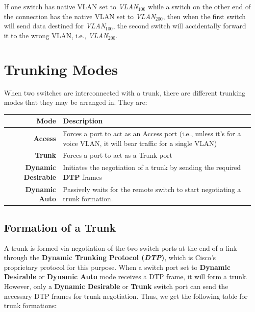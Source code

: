 If one switch has native VLAN set to \textit{VLAN$_{100}$} while a switch on the other end of the connection has the native VLAN set to \textit{VLAN$_{200}$},  then when the first switch will send data destined for \textit{VLAN$_{100}$}, the second switch will accidentally forward it to the wrong VLAN, i.e., \textit{VLAN$_{200}$}. 

\section{Trunking Modes}
When two switches are interconnected with a trunk, there are different trunking modes that they may be arranged in. They are: 

\noindent
\begin{center}
	\begin{tabular}{rm{}}
		\toprule
		\textbf{Mode} &\textbf{Description} \\
		\midrule
		\textbf{Access}	&Forces a port to act as an Access port (i.e., unless it's for a voice VLAN, it will bear traffic for a single VLAN)\\
		\textbf{Trunk}	&Forces a port to act as a Trunk port\\
		\textbf{Dynamic Desirable}	&Initiates the negotiation of a trunk by sending the required \textbf{DTP} frames\\
		\textbf{Dynamic Auto}	&Passively waits for the remote switch to start negotiating a trunk formation.\\
		\bottomrule
	\end{tabular}
\end{center}

\subsection{Formation of a Trunk}
A trunk is formed via negotiation of the two switch ports at the end of a link through the \textbf{Dynamic Trunking Protocol (\textit{DTP})}, which is Cisco's proprietary protocol for this purpose. When a switch port set to \textbf{Dynamic Desirable} or \textbf{Dynamic Auto} mode receives a DTP frame, it will form a trunk. However, only a \textbf{Dynamic Desirable} or \textbf{Trunk} switch port can send the necessary DTP frames for trunk negotiation. Thus, we get the following table for trunk formations:

